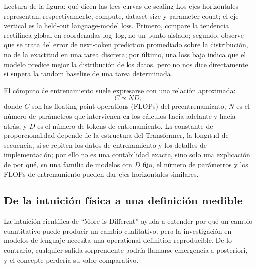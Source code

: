 
\begin{knowledgebox}{Lectura de la figura: qué dicen las tres curvas de scaling}
Los ejes horizontales representan, respectivamente, compute, dataset size y parameter count; el eje vertical es la held-out language-model loss. Primero, compare la tendencia rectilínea global en coordenadas log--log, no un punto aislado; segundo, observe que se trata del error de next-token prediction promediado sobre la distribución, no de la exactitud en una tarea discreta; por último, una loss baja indica que el modelo predice mejor la distribución de los datos, pero no nos dice directamente si supera la random baseline de una tarea determinada.
\end{knowledgebox}

El cómputo de entrenamiento suele expresarse con una relación aproximada:
\[
C \propto N D,
\]
donde $C$ son las floating-point operations (FLOPs) del preentrenamiento, $N$ es el número de parámetros que intervienen en los cálculos hacia adelante y hacia atrás, y $D$ es el número de tokens de entrenamiento. La constante de proporcionalidad depende de la estructura del Transformer, la longitud de secuencia, si se repiten los datos de entrenamiento y los detalles de implementación; por ello no es una contabilidad exacta, sino solo una explicación de por qué, en una familia de modelos con $D$ fijo, el número de parámetros y los FLOPs de entrenamiento pueden dar ejes horizontales similares.


\subsection{De la intuición física a una definición medible}

La intuición científica de ``More is Different'' ayuda a entender por qué un cambio cuantitativo puede producir un cambio cualitativo, pero la investigación en modelos de lenguaje necesita una operational definition reproducible. De lo contrario, cualquier salida sorprendente podría llamarse emergencia a posteriori, y el concepto perdería su valor comparativo.

